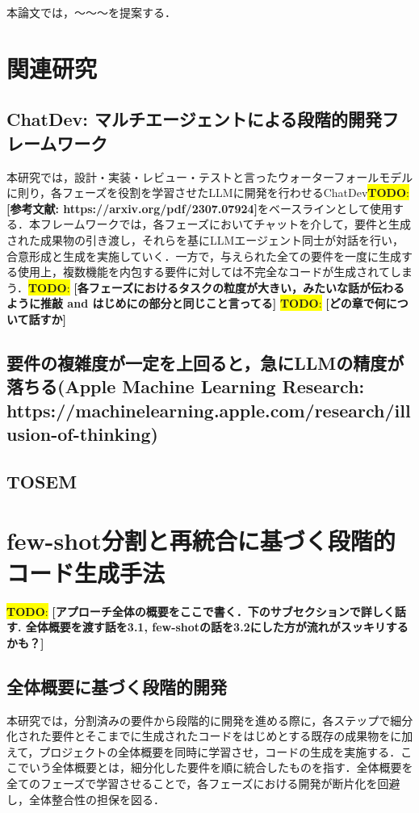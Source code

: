 \documentclass[submit,techrep,noauthor]{ipsj}
\newcommand{\todo}[1]{\colorbox{yellow}{{\bf TODO}:}{\color{red} {\textbf{[#1]}}}}
\begin{document}
本論文では，〜〜〜を提案する．

\section{関連研究}
\label{sec:format}

\subsection{ChatDev: マルチエージェントによる段階的開発フレームワーク}
本研究では，設計・実装・レビュー・テストと言ったウォーターフォールモデルに則り，各フェーズを役割を学習させたLLMに開発を行わせるChatDev\todo{参考文献: https://arxiv.org/pdf/2307.07924}をベースラインとして使用する．本フレームワークでは，各フェーズにおいてチャットを介して，要件と生成された成果物の引き渡し，それらを基にLLMエージェント同士が対話を行い，合意形成と生成を実施していく．一方で，与えられた全ての要件を一度に生成する使用上，複数機能を内包する要件に対しては不完全なコードが生成されてしまう．\todo{各フェーズにおけるタスクの粒度が大きい，みたいな話が伝わるように推敲 and はじめにの部分と同じこと言ってる}
\todo{どの章で何について話すか}

\subsection{要件の複雑度が一定を上回ると，急にLLMの精度が落ちる(Apple Machine Learning Research: https://machinelearning.apple.com/research/illusion-of-thinking)}


\subsection{TOSEM}




\section{few-shot分割と再統合に基づく段階的コード生成手法}

\todo{アプローチ全体の概要をここで書く．下のサブセクションで詳しく話す. 全体概要を渡す話を3.1, few-shotの話を3.2にした方が流れがスッキリするかも？}

\subsection{全体概要に基づく段階的開発}
本研究では，分割済みの要件から段階的に開発を進める際に，各ステップで細分化された要件とそこまでに生成されたコードをはじめとする既存の成果物をに加えて，プロジェクトの全体概要を同時に学習させ，コードの生成を実施する．ここでいう全体概要とは，細分化した要件を順に統合したものを指す．全体概要を全てのフェーズで学習させることで，各フェーズにおける開発が断片化を回避し，全体整合性の担保を図る．
\end{document}
